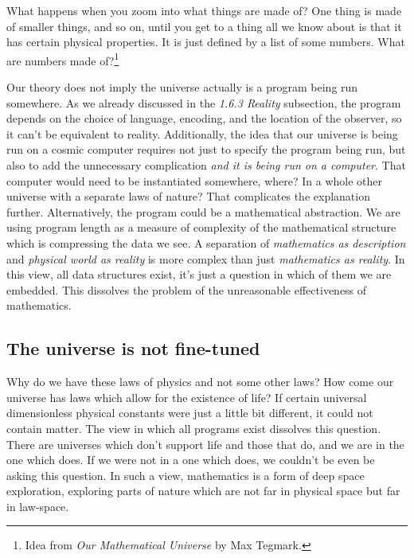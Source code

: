 What happens when you zoom into what things are made of?
One thing is made of smaller things, and so on, until you get to a thing all we know about is that it has certain physical properties.
It is just defined by a list of some numbers.
What are numbers made of?\footnote{Idea from \textit{Our Mathematical Universe} by Max Tegmark.}

Our theory does not imply the universe actually is a program being run somewhere.
As we already discussed in the \textit{1.6.3 Reality} subsection, the program depends on the choice of language, encoding, and the location of the observer, so it can't be equivalent to reality.
Additionally, the idea that our universe is being run on a cosmic computer requires not just to specify the program being run, but also to add the unnecessary complication \textit{and it is being run on a computer}. 
That computer would need to be instantiated somewhere, where?
In a whole other universe with a separate laws of nature?
That complicates the explanation further. 
Alternatively, the program could be a mathematical abstraction.
We are using program length as a measure of complexity of the mathematical structure which is compressing the data we see.
A separation of \textit{mathematics as description} and \textit{physical world as reality} is more complex than just \textit{mathematics as reality}.
In this view, all data structures exist, it's just a question in which of them we are embedded.
This dissolves the problem of the unreasonable effectiveness of mathematics.

\newpage

\subsection{The universe is not fine-tuned}

Why do we have these laws of physics and not some other laws?
How come our universe has laws which allow for the existence of life? 
If certain universal dimensionless physical constants were just a little bit different, it could not contain matter.
The view in which all programs exist dissolves this question.
There are universes which don't support life and those that do, and we are in the one which does.
If we were not in a one which does, we couldn't be even be asking this question.
In such a view, mathematics is a form of deep space exploration, exploring parts of nature which are not far in physical space but far in law-space.

\newpage

